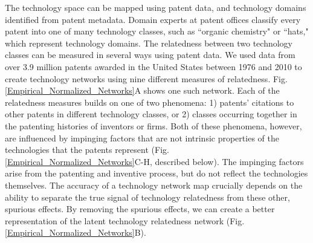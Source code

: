 \documentclass[pre,reprint,groupedaddress,superscriptaddress]{revtex4-1}
\begin{document}
The technology space can be mapped using patent data, and technology domains identified from patent metadata. Domain experts at patent offices classify every patent into one of many technology classes, such as ``organic chemistry" or ``hats," which represent technology domains. The relatedness between two technology classes can be measured in several ways using patent data. We used data from over 3.9 million patents awarded in the United States between 1976 and 2010 to create technology networks using nine different measures of relatedness. Fig. \ref{Empirical_Normalized_Networks}A shows one such network. Each of the relatedness measures builds on one of two phenomena: 1) patents' citations to other patents in different technology classes, or 2) classes occurring together in the patenting histories of inventors or firms. Both of these phenomena, however, are influenced by impinging factors that are not intrinsic properties of the technologies that the patents represent (Fig. \ref{Empirical_Normalized_Networks}C-H, described below). The impinging factors arise from the patenting and inventive process, but do not reflect the technologies themselves.
The accuracy of a technology network map crucially depends on the ability to separate the true signal of technology relatedness from these other, spurious effects. By removing the spurious effects, we can create a better representation of the latent technology relatedness network (Fig. \ref{Empirical_Normalized_Networks}B).
\end{document}

